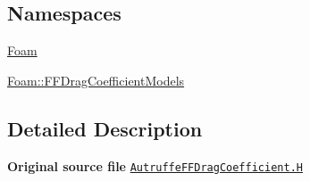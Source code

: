 \subsection*{Namespaces}
\begin{DoxyCompactItemize}
\item 
 \hyperlink{namespaceFoam}{Foam}
\item 
 \hyperlink{namespaceFoam_1_1FFDragCoefficientModels}{Foam\+::\+F\+F\+Drag\+Coefficient\+Models}
\end{DoxyCompactItemize}


\subsection{Detailed Description}
{\bfseries Original source file} \href{../../../home/carlo/data/GeN-Foam/GeN-Foam_ffn/GeN-Foam/GeN-Foam/classes/thermalHydraulics/src/physicsModels/dragModels/FFDragCoefficientModels/Autruffe/AutruffeFFDragCoefficient.H}{\tt Autruffe\+F\+F\+Drag\+Coefficient.\+H} 